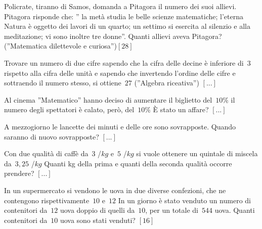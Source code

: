 \begin{multicols}{2}
\begin{esercizio}[\Ast]
\label{ese:14.44}
Policrate, tiranno di Samos, domanda a Pitagora il numero dei suoi allievi. 
Pitagora risponde che: '' la metà studia le belle scienze matematiche; l'eterna 
Natura è oggetto dei lavori di un quarto; un settimo si esercita al silenzio e 
alla meditazione; vi sono inoltre tre donne''. Quanti allievi aveva Pitagora? 
(''Matematica dilettevole e curiosa'')\hfill \(\left[28\right]\)
\end{esercizio}

\begin{esercizio}
\label{ese:14.45}
Trovare un numero di due cifre sapendo che la cifra delle decine è inferiore 
di~\(3\) rispetto alla cifra delle unità e sapendo che invertendo l'ordine delle 
cifre e sottraendo il numero stesso, si ottiene~\(27\) (''Algebra riceativa'')
 \hfill \(\left[...\right]\)
\end{esercizio}

\begin{esercizio}
\label{ese:14.46}
Al cinema ''Matematico'' hanno deciso di aumentare il biglietto del~\(10 \%\) il 
numero degli spettatori è calato, però, del~\(10 \%\) È stato un affare?
 \hfill \(\left[...\right]\)
\end{esercizio}

\begin{esercizio}
\label{ese:14.47}
A mezzogiorno le lancette dei minuti e delle ore sono sovrapposte. Quando 
saranno di nuovo sovrapposte? \hfill \(\left[...\right]\)
\end{esercizio}

\begin{esercizio}
\label{ese:14.48}
Con due qualità di caffè da~\(3\) \officialeuro/\(\unit{kg}\) e~\(5\) 
\officialeuro/\(\unit{kg}\) si vuole ottenere un quintale di miscela da~\(3,25\) 
\officialeuro/\(\unit{kg}\) Quanti kg della prima e quanti della seconda qualità 
occorre prendere? \hfill \(\left[...\right]\)
\end{esercizio}

\begin{esercizio}[\Ast]
\label{ese:14.49}
In un supermercato si vendono le uova in due diverse confezioni, che ne 
contengono rispettivamente~\(10\) e~\(12\) In un giorno è stato venduto un numero 
di 
contenitori da~\(12\) uova doppio di quelli da~\(10\), per un totale di~\(544\) uova. 
Quanti contenitori da~\(10\) uova sono stati venduti? \hfill \(\left[16\right]\)
\end{esercizio}


\end{multicols}
